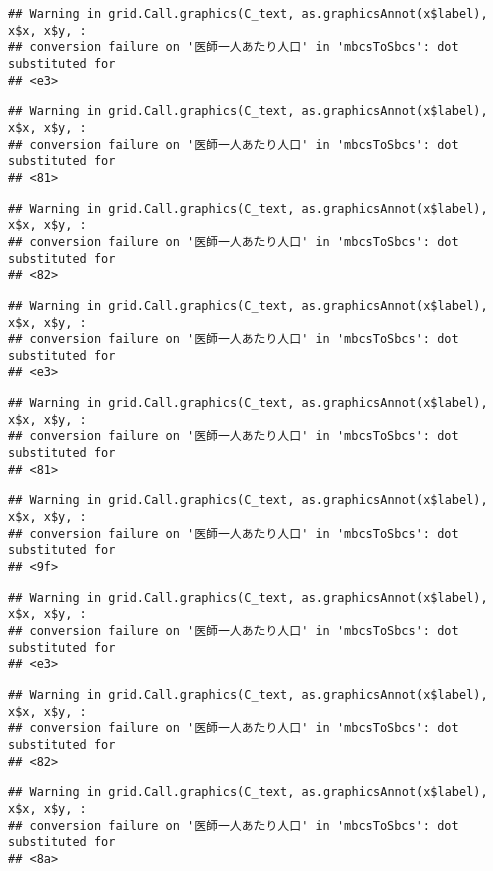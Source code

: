 \documentclass[
]{article}
\begin{document}
\begin{verbatim}
## Warning in grid.Call.graphics(C_text, as.graphicsAnnot(x$label), x$x, x$y, :
## conversion failure on '医師一人あたり人口' in 'mbcsToSbcs': dot substituted for
## <e3>
\end{verbatim}

\begin{verbatim}
## Warning in grid.Call.graphics(C_text, as.graphicsAnnot(x$label), x$x, x$y, :
## conversion failure on '医師一人あたり人口' in 'mbcsToSbcs': dot substituted for
## <81>
\end{verbatim}

\begin{verbatim}
## Warning in grid.Call.graphics(C_text, as.graphicsAnnot(x$label), x$x, x$y, :
## conversion failure on '医師一人あたり人口' in 'mbcsToSbcs': dot substituted for
## <82>
\end{verbatim}

\begin{verbatim}
## Warning in grid.Call.graphics(C_text, as.graphicsAnnot(x$label), x$x, x$y, :
## conversion failure on '医師一人あたり人口' in 'mbcsToSbcs': dot substituted for
## <e3>
\end{verbatim}

\begin{verbatim}
## Warning in grid.Call.graphics(C_text, as.graphicsAnnot(x$label), x$x, x$y, :
## conversion failure on '医師一人あたり人口' in 'mbcsToSbcs': dot substituted for
## <81>
\end{verbatim}

\begin{verbatim}
## Warning in grid.Call.graphics(C_text, as.graphicsAnnot(x$label), x$x, x$y, :
## conversion failure on '医師一人あたり人口' in 'mbcsToSbcs': dot substituted for
## <9f>
\end{verbatim}

\begin{verbatim}
## Warning in grid.Call.graphics(C_text, as.graphicsAnnot(x$label), x$x, x$y, :
## conversion failure on '医師一人あたり人口' in 'mbcsToSbcs': dot substituted for
## <e3>
\end{verbatim}

\begin{verbatim}
## Warning in grid.Call.graphics(C_text, as.graphicsAnnot(x$label), x$x, x$y, :
## conversion failure on '医師一人あたり人口' in 'mbcsToSbcs': dot substituted for
## <82>
\end{verbatim}

\begin{verbatim}
## Warning in grid.Call.graphics(C_text, as.graphicsAnnot(x$label), x$x, x$y, :
## conversion failure on '医師一人あたり人口' in 'mbcsToSbcs': dot substituted for
## <8a>
\end{verbatim}
\end{document}
